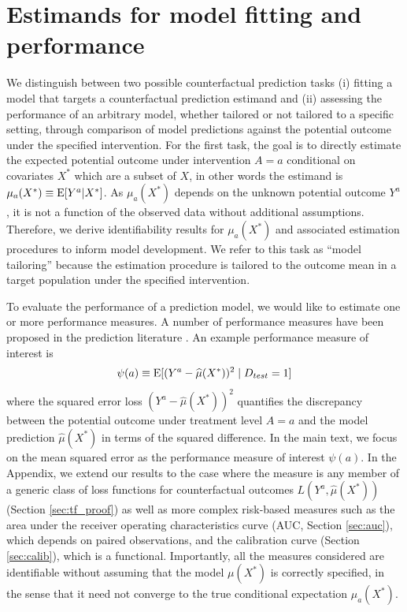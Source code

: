 \section{Estimands for model fitting and performance} \label{sec:targets}
We distinguish between two possible counterfactual prediction tasks (i) fitting a model that targets a counterfactual prediction estimand and (ii) assessing the performance of an arbitrary model, whether tailored or not tailored to a specific setting, through comparison of model predictions against the potential outcome under the specified intervention. For the first task, the goal is to directly estimate the expected potential outcome under intervention $A = a$ conditional on covariates $X^*$ which are a subset of $X$, in other words the estimand is $\mu_a(X^*) \equiv \operatorname{E}[Y^a | X^*]$. As $\mu_a(X^*)$ depends on the unknown potential outcome $Y^a$, it is not a function of the observed data without additional assumptions. Therefore, we derive identifiability results for $\mu_a(X^*)$ and associated estimation procedures to inform model development. We refer to this task as ``model tailoring'' because the estimation procedure is tailored to the outcome mean in a target population under the specified intervention.

To evaluate the performance of a prediction model, we would like to estimate one or more performance measures.  A number of performance measures have been proposed in the prediction literature \cite{harrell_multivariable_1996, altman_what_2000, steyerberg_clinical_2019}. An example performance measure of interest is 
\begin{equation*}
    \psi(a) \equiv \operatorname{E}[(Y^a - \widehat{\mu}(X^*))^2 \mid D_{test} = 1]
\end{equation*}
where the squared error loss $(Y^a - \widehat{\mu}(X^*))^2$ quantifies the discrepancy between the potential outcome under treatment level $A = a$ and the model prediction $\widehat{\mu}(X^*)$ in terms of the squared difference. In the main text, we focus on the mean squared error as the performance measure of interest $\psi(a)$. In the Appendix, we extend our results to the case where the measure is any member of a generic class of loss functions for counterfactual outcomes $L(Y^a,  \widehat{\mu}(X^*))$ (Section \ref{sec:tf_proof}) as well as more complex risk-based measures such as the area under the receiver operating characteristics curve (AUC, Section \ref{sec:auc}), which depends on paired observations, and the calibration curve (Section \ref{sec:calib}), which is a functional. Importantly, all the measures considered are identifiable without assuming that the model $\mu(X^*)$ is correctly specified, in the sense that it need not converge to the true conditional expectation $\mu_a(X^*)$.

